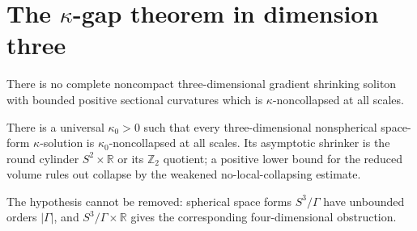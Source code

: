 \section{\texorpdfstring{The $\kappa$-gap theorem in dimension three}{The Kappa-gap theorem in dimension three}}

\begin{theorem}
\label{thm:chow-iii-no-3d-shrinker}

There is no complete noncompact three-dimensional gradient shrinking soliton
with bounded positive sectional curvatures which is $\kappa$-noncollapsed at
all scales.
\end{theorem}

\begin{theorem}
\label{thm:chow-iii-kappa-gap}


There is a universal $\kappa_0>0$ such that every three-dimensional
nonspherical space-form $\kappa$-solution is $\kappa_0$-noncollapsed at all
scales.  Its asymptotic shrinker is the round cylinder $S^2\times\mathbb R$
or its $\mathbb Z_2$ quotient; a positive lower bound for the reduced volume
rules out collapse by the weakened no-local-collapsing estimate.
\end{theorem}

\begin{remark}
\label{rem:chow-iii-kappa-gap-hypothesis}

The hypothesis cannot be removed: spherical space forms $S^3/\Gamma$ have
unbounded orders $|\Gamma|$, and $S^3/\Gamma\times\mathbb R$ gives the
corresponding four-dimensional obstruction.
\end{remark}
